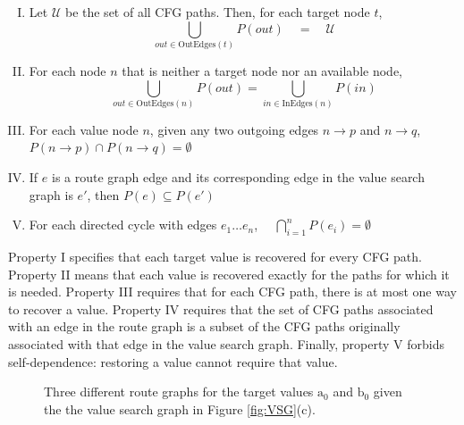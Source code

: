 \documentclass[12pt]{gatech-thesis}
\begin{document}
\begin{enumerate}[I)]

\item Let $\mathcal{U}$ be the set of all CFG paths. Then, for each target node $t$, 
	$$\bigcup_{\mathit{out} \in \text{OutEdges}(t)}P(\mathit{out}) \quad = \quad \mathcal{U} $$ 
	\label{rg-property-1}

\item For each node $n$ that is neither a target node nor an available node,
	$$\bigcup_{\mathit{out} \in \text{OutEdges} (n)} P(out) = \bigcup_{\mathit{in} \in \text{InEdges} (n)}P( \mathit{in} )$$ 

\item For each value node $n$, given any two outgoing edges $n\to p$ and $n\to q$, $P(n\to p) \cap P(n\to q) = \emptyset$ 

\item If $e$ is a route graph edge and its corresponding edge in the value search graph is $e'$, then $P(e) \subseteq P(e')$
	\label{rg-property-4}

\item For each directed cycle with edges $e_1 \dots e_n$,  $\quad \bigcap_{i=1}^n{P(e_{i})} = \emptyset$
	\label{rg-property-5}

\end{enumerate}

Property I specifies that each target value is recovered for every CFG path. 
Property II means that each value is recovered exactly for the paths for which it is needed.
Property III requires that for each CFG path, there is at most one way to recover a value. 
Property IV requires that the set of CFG paths associated with an edge in the route graph is a subset of the CFG paths originally associated with that edge in the value search graph. Finally, property V forbids self-dependence: restoring a value cannot require that value. 

\begin{figure}[htb]
\caption{Three different route graphs for the target values $\text{a}_{\text{0}}$ and $\text{b}_{\text{0}}$ given the the value search graph in Figure \ref{fig:VSG}(c). %
}
\label{fig:RG}
\end{figure}
\end{document}
